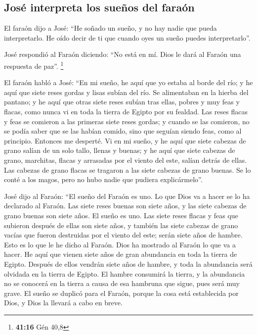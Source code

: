 \hypertarget{josuxe9-interpreta-los-sueuxf1os-del-farauxf3n}{%
\subsection{José interpreta los sueños del
faraón}\label{josuxe9-interpreta-los-sueuxf1os-del-farauxf3n}}

 El faraón dijo a José: ``He soñado un sueño, y no hay
nadie que pueda interpretarlo. He oído decir de ti que cuando oyes un
sueño puedes interpretarlo''.

 José respondió al Faraón diciendo: ``No está en mí. Dios
le dará al Faraón una respuesta de paz''. \footnote{\textbf{41:16} Gén
  40,8}

 El faraón habló a José: ``En mi sueño, he aquí que yo
estaba al borde del río;  y he aquí que siete reses
gordas y lisas subían del río. Se alimentaban en la hierba del pantano;
 y he aquí que otras siete reses subían tras ellas,
pobres y muy feas y flacas, como nunca vi en toda la tierra de Egipto
por su fealdad.  Las reses flacas y feas se comieron a
las primeras siete reses gordas;  y cuando se las
comieron, no se podía saber que se las habían comido, sino que seguían
siendo feas, como al principio. Entonces me desperté.  Vi
en mi sueño, y he aquí que siete cabezas de grano salían de un solo
tallo, llenas y buenas;  y he aquí que siete cabezas de
grano, marchitas, flacas y arrasadas por el viento del este, salían
detrás de ellas.  Las cabezas de grano flacas se tragaron
a las siete cabezas de grano buenas. Se lo conté a los magos, pero no
hubo nadie que pudiera explicármelo''.

 José dijo al Faraón: ``El sueño del Faraón es uno. Lo
que Dios va a hacer se lo ha declarado al Faraón.  Las
siete reses buenas son siete años, y las siete cabezas de grano buenas
son siete años. El sueño es uno.  Las siete reses flacas
y feas que subieron después de ellas son siete años, y también las siete
cabezas de grano vacías que fueron destruidas por el viento del este;
serán siete años de hambre.  Esto es lo que le he dicho
al Faraón. Dios ha mostrado al Faraón lo que va a hacer. 
He aquí que vienen siete años de gran abundancia en toda la tierra de
Egipto.  Después de ellos vendrán siete años de hambre, y
toda la abundancia será olvidada en la tierra de Egipto. El hambre
consumirá la tierra,  y la abundancia no se conocerá en
la tierra a causa de esa hambruna que sigue, pues será muy grave.
 El sueño se duplicó para el Faraón, porque la cosa está
establecida por Dios, y Dios la llevará a cabo en breve.

